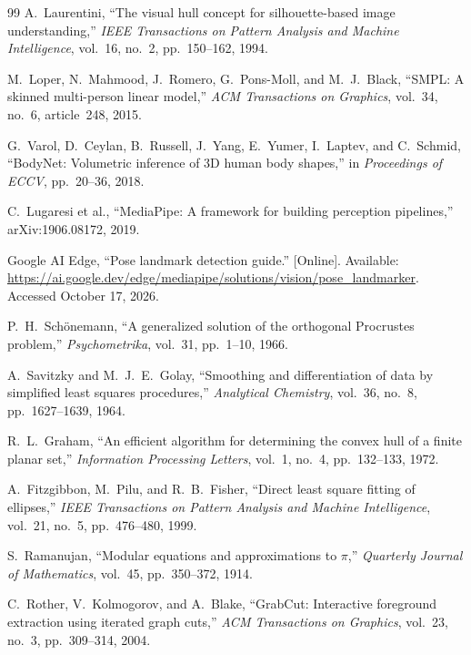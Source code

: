 \begin{thebibliography}{99}
A.~Laurentini, ``The visual hull concept for silhouette-based image understanding,'' \emph{IEEE Transactions on Pattern Analysis and Machine Intelligence}, vol.~16, no.~2, pp.~150--162, 1994.

M.~Loper, N.~Mahmood, J.~Romero, G.~Pons-Moll, and M.~J.~Black, ``SMPL: A skinned multi-person linear model,'' \emph{ACM Transactions on Graphics}, vol.~34, no.~6, article~248, 2015.

G.~Varol, D.~Ceylan, B.~Russell, J.~Yang, E.~Yumer, I.~Laptev, and C.~Schmid, ``BodyNet: Volumetric inference of 3D human body shapes,'' in \emph{Proceedings of ECCV}, pp.~20--36, 2018.

C.~Lugaresi et al., ``MediaPipe: A framework for building perception pipelines,'' arXiv:1906.08172, 2019.

Google AI Edge, ``Pose landmark detection guide.'' [Online]. Available: \url{https://ai.google.dev/edge/mediapipe/solutions/vision/pose_landmarker}. Accessed October 17, 2026.

P.~H.~Sch\"onemann, ``A generalized solution of the orthogonal Procrustes problem,'' \emph{Psychometrika}, vol.~31, pp.~1--10, 1966.

A.~Savitzky and M.~J.~E.~Golay, ``Smoothing and differentiation of data by simplified least squares procedures,'' \emph{Analytical Chemistry}, vol.~36, no.~8, pp.~1627--1639, 1964.

R.~L.~Graham, ``An efficient algorithm for determining the convex hull of a finite planar set,'' \emph{Information Processing Letters}, vol.~1, no.~4, pp.~132--133, 1972.

A.~Fitzgibbon, M.~Pilu, and R.~B.~Fisher, ``Direct least square fitting of ellipses,'' \emph{IEEE Transactions on Pattern Analysis and Machine Intelligence}, vol.~21, no.~5, pp.~476--480, 1999.

S.~Ramanujan, ``Modular equations and approximations to $\pi$,'' \emph{Quarterly Journal of Mathematics}, vol.~45, pp.~350--372, 1914.

C.~Rother, V.~Kolmogorov, and A.~Blake, ``GrabCut: Interactive foreground extraction using iterated graph cuts,'' \emph{ACM Transactions on Graphics}, vol.~23, no.~3, pp.~309--314, 2004.


\end{thebibliography}
